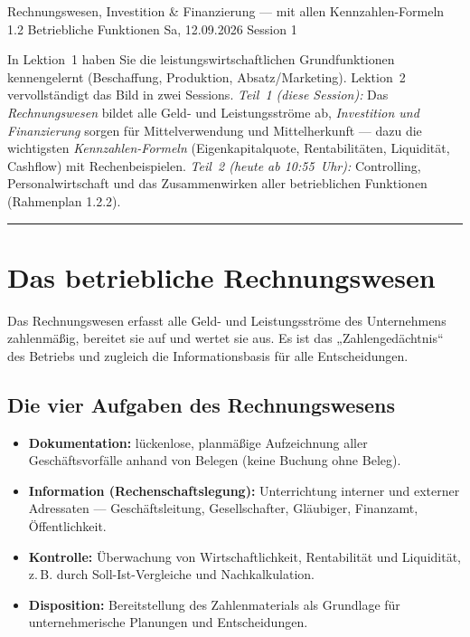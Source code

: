 \documentclass[11pt, a4paper]{article}
\begin{document}
%
  {Rechnungswesen, Investition \& Finanzierung --- mit allen Kennzahlen-Formeln}%
  {1.2 Betriebliche Funktionen}%
  {Sa, 12.09.2026 \textperiodcentered{} Session 1}

\begin{merksatz}[title={\bfseries Worum geht es in dieser Session?}]
In Lektion~1 haben Sie die leistungswirtschaftlichen Grundfunktionen kennengelernt
(Beschaffung, Produktion, Absatz/Marketing). Lektion~2 vervollständigt das Bild in zwei
Sessions. \emph{Teil~1 (diese Session):} Das \emph{Rechnungswesen} bildet alle Geld- und
Leistungsströme ab, \emph{Investition und Finanzierung} sorgen für Mittelverwendung und
Mittelherkunft --- dazu die wichtigsten \emph{Kennzahlen-Formeln} (Eigenkapitalquote,
Rentabilitäten, Liquidität, Cashflow) mit Rechenbeispielen. \emph{Teil~2 (heute ab
10:55~Uhr):} Controlling, Personalwirtschaft und das Zusammenwirken aller betrieblichen
Funktionen (Rahmenplan 1.2.2).
\end{merksatz}

\tableofcontents
\vspace{1em}
\hrule
\vspace{1em}

\section{Das betriebliche Rechnungswesen}

Das Rechnungswesen erfasst alle Geld- und Leistungsströme des Unternehmens zahlenmäßig,
bereitet sie auf und wertet sie aus. Es ist das „Zahlengedächtnis`` des Betriebs und
zugleich die Informationsbasis für alle Entscheidungen.

\subsection{Die vier Aufgaben des Rechnungswesens}

\begin{itemize}
  \item \textbf{Dokumentation:} lückenlose, planmäßige Aufzeichnung aller
    Geschäftsvorfälle anhand von Belegen (keine Buchung ohne Beleg).
  \item \textbf{Information (Rechenschaftslegung):} Unterrichtung interner und externer
    Adressaten --- Geschäftsleitung, Gesellschafter, Gläubiger, Finanzamt, Öffentlichkeit.
  \item \textbf{Kontrolle:} Überwachung von Wirtschaftlichkeit, Rentabilität und
    Liquidität, z.\,B. durch Soll-Ist-Vergleiche und Nachkalkulation.
  \item \textbf{Disposition:} Bereitstellung des Zahlenmaterials als Grundlage für
    unternehmerische Planungen und Entscheidungen.
\end{itemize}
\end{document}
